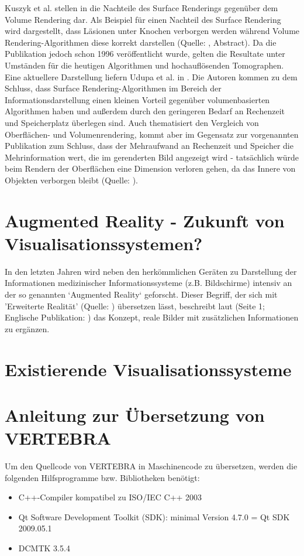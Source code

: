 \documentclass[a4paper,titlepage,12pt]{scrartcl}
\newtheorem[L]{boxedDefinition}{Definition}
\begin{document}
Kuszyk et al. stellen in \cite{Kuszyk1996} die Nachteile des Surface Renderings gegenüber dem Volume Rendering dar. Als Beispiel für einen Nachteil des Surface Rendering wird dargestellt, dass Läsionen unter Knochen verborgen werden während Volume Rendering-Algorithmen diese korrekt darstellen (Quelle: \cite{Kuszyk1996}, Abstract). Da die Publikation jedoch schon 1996 veröffentlicht wurde, gelten die Resultate unter Umständen für die heutigen Algorithmen und hochauflösenden Tomographen. Eine aktuellere Darstellung liefern Udupa et al. in \cite{Udupa2009}. Die Autoren kommen zu dem Schluss, dass Surface Rendering-Algorithmen im Bereich der Informationsdarstellung einen kleinen Vorteil gegenüber volumenbasierten Algorithmen haben und außerdem durch den geringeren Bedarf an Rechenzeit und Speicherplatz überlegen sind. Auch \cite{Bruckner2004} thematisiert den Vergleich von Oberflächen- und Volumenrendering, kommt aber im Gegensatz zur vorgenannten Publikation zum Schluss, dass der Mehraufwand an Rechenzeit und Speicher die Mehrinformation wert, die im gerenderten Bild angezeigt wird - tatsächlich würde beim Rendern der Oberflächen eine Dimension verloren gehen, da das Innere von Objekten verborgen bleibt (Quelle: \cite[Seite 2f.]{Bruckner2004}).

\section{Augmented Reality - Zukunft von Visualisationssystemen?}\label{sec:augmentedreality}
In den letzten Jahren wird neben den herkömmlichen Geräten zu Darstellung der Informationen medizinischer Informationssysteme (z.B. Bildschirme) intensiv an der so genannten `Augmented Reality` geforscht. Dieser Begriff, der sich mit 'Erweiterte Realität' (Quelle: \cite[Seite 1]{Toe2010}) übersetzen lässt, beschreibt laut \cite{Suthau2002DE} (Seite 1; Englische Publikation: \cite{Suthau2002}) das Konzept, reale Bilder mit zusätzlichen Informationen zu ergänzen.

\section{Existierende Visualisationssysteme} \label{ssec:existingtvss}

\appendix \label{appendixstart}
\section{Anleitung zur Übersetzung von VERTEBRA}
Um den Quellcode von VERTEBRA in Maschinencode zu übersetzen, werden die folgenden Hilfsprogramme bzw. Bibliotheken benötigt:
\begin{itemize}
 \item C++-Compiler kompatibel zu ISO/IEC C++ 2003
 \item Qt Software Development Toolkit (SDK): minimal Version 4.7.0 = Qt SDK 2009.05.1
 \item DCMTK 3.5.4
\end{itemize}
\end{document}
